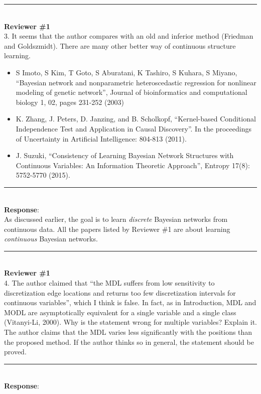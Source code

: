 \documentclass{article}
\begin{document}
\noindent\rule{8cm}{0.4pt}\\
{\bf Reviewer \#1} \\

3. It seems that the author compares with an old and inferior method (Friedman and Goldszmidt).
There are many other better way of continuous structure learning.

\begin{itemize}
\item S Imoto, S Kim, T Goto, S Aburatani, K Tashiro, S Kuhara, S Miyano, ``Bayesian  network and nonparametric heteroscedastic regression for nonlinear modeling of  genetic network'', Journal of bioinformatics and computational biology 1, 02,  pages 231-252 (2003)
\item K. Zhang, J. Peters, D. Janzing, and B. Scholkopf, ``Kernel-based Conditional Independence Test and  Application in Causal Discovery''. In the proceedings of Uncertainty in Artificial Intelligence: 804-813 (2011).
\item J. Suzuki, ``Consistency of Learning Bayesian Network Structures with Continuous Variables: An Information  Theoretic Approach'', Entropy 17(8): 5752-5770 (2015).
\end{itemize}

\noindent\rule{8cm}{0.4pt}\\
{\bf Response}:\\

As discussed earlier, the goal is to learn \textit{discrete} Bayesian networks from continuous data.
All the papers listed by Reviewer \#1 are about learning \textit{continuous} Bayesian networks.

\noindent\rule{8cm}{0.4pt}\\
{\bf Reviewer \#1} \\

4. The author claimed that ``the MDL suffers from low sensitivity to discretization edge locations and returns too few discretization intervals for continuous variables'', which I think is false. In fact, as in Introduction, MDL and MODL are asymptotically equivalent for a single variable and a single class  (Vitanyi-Li, 2000).  Why is the statement wrong for multiple variables? Explain it. The author claims that the MDL varies less significantly with the positions than the proposed method.  If the author thinks so in general, the statement should be proved.

\noindent\rule{8cm}{0.4pt}\\
{\bf Response}:\\
\end{document}

